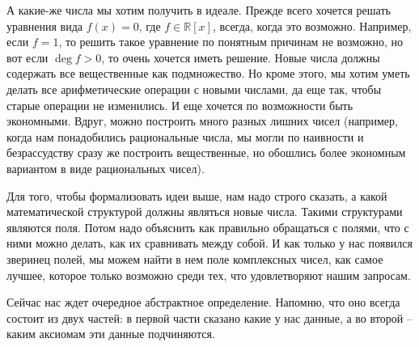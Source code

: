 А какие-же числа мы хотим получить в идеале.
Прежде всего хочется решать уравнения вида $f(x) = 0$, где $f\in \mathbb R[x]$, всегда, когда это возможно.
Например, если $f = 1$, то решить такое уравнение по понятным причинам не возможно, но вот если $\deg f > 0$, то очень хочется иметь решение.
Новые числа должны содержать все вещественные как подмножество.
Но кроме этого, мы хотим уметь делать все арифметические операции с новыми числами, да еще так, чтобы старые операции не изменились.
И еще хочется по возможности быть экономными.
Вдруг, можно построить много разных лишних чисел (например, когда нам понадобились рациональные числа, мы могли по наивности и безрассудству сразу же построить вещественные, но обошлись более экономным вариантом в виде рациональных чисел).

Для того, чтобы формализовать идеи выше, нам надо строго сказать, а какой математической структурой должны являться новые числа.
Такими структурами являются поля.
Потом надо объяснить как правильно обращаться с полями, что с ними можно делать, как их сравнивать между собой.
И как только у нас появился зверинец полей, мы можем найти в нем поле комплексных чисел, как самое лучшее, которое только возможно среди тех, что удовлетворяют нашим запросам.


Сейчас нас ждет очередное абстрактное определение.
Напомню, что оно всегда состоит из двух частей: в первой части сказано какие у нас данные, а во второй -- каким аксиомам эти данные подчиняются.

